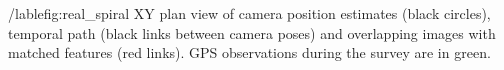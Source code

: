 /lable{fig:real_spiral} XY plan view of camera position estimates (black circles), temporal path (black links between camera poses) and overlapping images with matched features (red links). GPS observations during the survey are in green.
  